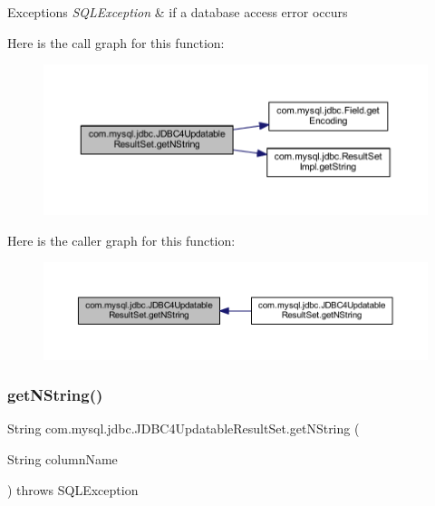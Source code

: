 \begin{DoxyExceptions}{Exceptions}
{\em S\+Q\+L\+Exception} & if a database access error occurs \\
\hline
\end{DoxyExceptions}
Here is the call graph for this function\+:
\nopagebreak
\begin{figure}[H]
\begin{center}
\leavevmode
\includegraphics[width=350pt]{classcom_1_1mysql_1_1jdbc_1_1_j_d_b_c4_updatable_result_set_a1ae3fcafdcb02c78190318d321aa0fd2_cgraph}
\end{center}
\end{figure}
Here is the caller graph for this function\+:
\nopagebreak
\begin{figure}[H]
\begin{center}
\leavevmode
\includegraphics[width=350pt]{classcom_1_1mysql_1_1jdbc_1_1_j_d_b_c4_updatable_result_set_a1ae3fcafdcb02c78190318d321aa0fd2_icgraph}
\end{center}
\end{figure}
\mbox{\label{classcom_1_1mysql_1_1jdbc_1_1_j_d_b_c4_updatable_result_set_af34b33244f25a186c3117ba260cb8fc4}} 
\subsubsection{\texorpdfstring{get\+N\+String()}{getNString()}\hspace{0.1cm}{\footnotesize\ttfamily [2/2]}}
{\footnotesize\ttfamily String com.\+mysql.\+jdbc.\+J\+D\+B\+C4\+Updatable\+Result\+Set.\+get\+N\+String (\begin{DoxyParamCaption}\item[{String}]{column\+Name }\end{DoxyParamCaption}) throws S\+Q\+L\+Exception}

